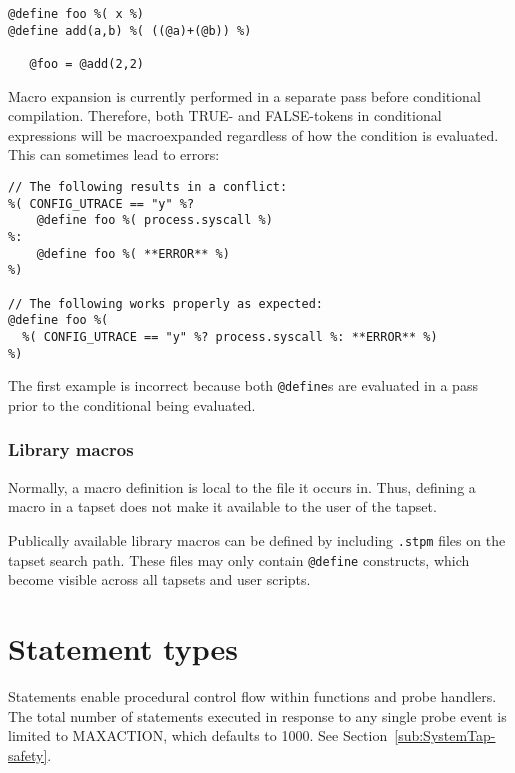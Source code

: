 \documentclass[twoside,english]{article}
\newenvironment{vindent}
{\begin{list}{}{\setlength{\listparindent}{6pt}}
\item[]}
{\end{list}}
\begin{document}
\begin{vindent}
\begin{verbatim}
@define foo %( x %)
@define add(a,b) %( ((@a)+(@b)) %)

   @foo = @add(2,2)
\end{verbatim}
\end{vindent}

Macro expansion is currently performed in a separate pass before
conditional compilation. Therefore, both TRUE- and FALSE-tokens in
conditional expressions will be macroexpanded regardless of how the
condition is evaluated. This can sometimes lead to errors:

\begin{vindent}
\begin{verbatim}
// The following results in a conflict:
%( CONFIG_UTRACE == "y" %?
    @define foo %( process.syscall %)
%:
    @define foo %( **ERROR** %)
%)

// The following works properly as expected:
@define foo %(
  %( CONFIG_UTRACE == "y" %? process.syscall %: **ERROR** %)
%)
\end{verbatim}
\end{vindent}

The first example is incorrect because both \texttt{@define}s are
evaluated in a pass prior to the conditional being evaluated.

\subsubsection{Library macros}

Normally, a macro definition is local to the file it occurs in. Thus,
defining a macro in a tapset does not make it available to the user of
the tapset.

Publically available library macros can be defined by including
\texttt{.stpm} files on the tapset search path. These files may only
contain \texttt{@define} constructs, which become visible across all
tapsets and user scripts.

\section{Statement types\label{sec:Statement-Types}}

Statements enable procedural control flow within functions and probe handlers.
The total number of statements executed in response to any single probe event
is limited to MAXACTION, which defaults to 1000. See Section~\ref{sub:SystemTap-safety}.
\end{document}
